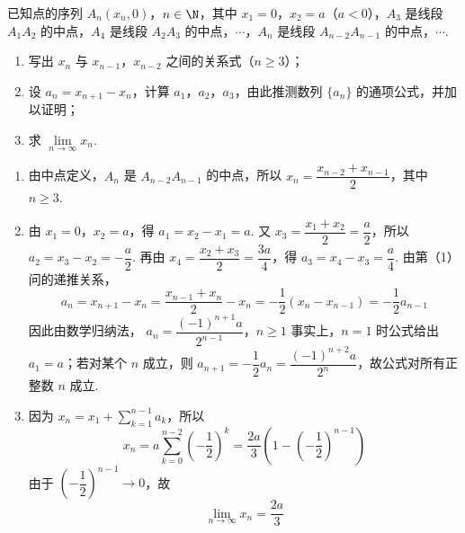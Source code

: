 \begin{problem}
已知点的序列 \(A_{n}(x_{n},0)\)，\(n\in\N\)，其中 \(x_{1}=0\)，\(x_{2}=a\)（\(a<0\)），\(A_{3}\) 是线段 \(A_{1}A_{2}\) 的中点，\(A_{4}\) 是线段 \(A_{2}A_{3}\) 的中点，\(\cdots\)，\(A_{n}\) 是线段 \(A_{n-2}A_{n-1}\) 的中点，\(\cdots\).

\begin{enumerate}
\item 写出 \(x_{n}\) 与 \(x_{n-1}\)，\(x_{n-2}\) 之间的关系式（\(n\geqslant3\)）；
\item 设 \(a_{n}=x_{n+1}-x_{n}\)，计算 \(a_{1}\)，\(a_{2}\)，\(a_{3}\)，由此推测数列 \(\{a_{n}\}\) 的通项公式，并加以证明；
\item 求 \(\displaystyle\lim\limits_{n\to\infty}x_{n}\).
\end{enumerate}
\end{problem}

\begin{solution}
\begin{enumerate}
\item 由中点定义，\(A_{n}\) 是 \(A_{n-2}A_{n-1}\) 的中点，所以
 \(x_{n}=\dfrac{x_{n-2}+x_{n-1}}{2}\)，其中 \(n\geqslant3\).

\item 由 \(x_{1}=0\)，\(x_{2}=a\)，得 \(a_{1}=x_{2}-x_{1}=a\). 又 \(x_{3}=\dfrac{x_{1}+x_{2}}{2}=\dfrac{a}{2}\)，所以 \(a_{2}=x_{3}-x_{2}=-\dfrac{a}{2}\). 再由 \(x_{4}=\dfrac{x_{2}+x_{3}}{2}=\dfrac{3a}{4}\)，得 \(a_{3}=x_{4}-x_{3}=\dfrac{a}{4}\).
由第（1）问的递推关系，
\[
a_{n}=x_{n+1}-x_{n}=\dfrac{x_{n-1}+x_{n}}{2}-x_{n}=-\dfrac{1}{2}(x_{n}-x_{n-1})=-\dfrac{1}{2}a_{n-1}
\]
因此由数学归纳法，
\(a_{n}=\dfrac{(-1)^{n+1}a}{2^{n-1}}\)，\(n\geqslant1\)
事实上，\(n=1\) 时公式给出 \(a_{1}=a\)；若对某个 \(n\) 成立，则 \(a_{n+1}=-\dfrac12a_{n}=\dfrac{(-1)^{n+2}a}{2^{n}}\)，故公式对所有正整数 \(n\) 成立.

\item 因为 \(x_{n}=x_{1}+\sum_{k=1}^{n-1}a_{k}\)，所以
\[
x_{n}=a\sum_{k=0}^{n-2}\left(-\dfrac12\right)^{k}=\dfrac{2a}{3}\left(1-\left(-\dfrac12\right)^{n-1}\right)
\]
由于 \(\left(-\dfrac12\right)^{n-1}\to0\)，故
\[
\displaystyle\lim\limits_{n\to\infty}x_{n}=\dfrac{2a}{3}
\]
\end{enumerate}
\end{solution}
